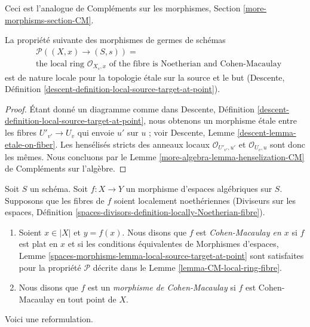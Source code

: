 \noindent
Ceci est l'analogue de Compléments sur les morphismes, Section
\ref{more-morphisms-section-CM}.

\begin{lemma}
\label{lemma-CM-local-ring-fibre}
La propriété suivante des morphismes de germes de schémas
\begin{align*}
& \mathcal{P}((X, x) \to (S, s)) = \\
& \text{the local ring }
\mathcal{O}_{X_s, x}
\text{ of the fibre is Noetherian and Cohen-Macaulay}
\end{align*}
est de nature locale pour la topologie étale sur la source et le but (Descente, Définition
\ref{descent-definition-local-source-target-at-point}).
\end{lemma}

\begin{proof}
Étant donné un diagramme comme dans
Descente, Définition \ref{descent-definition-local-source-target-at-point},
nous obtenons un morphisme étale entre les fibres
$U'_{v'} \to U_v$ qui envoie $u'$ sur $u$ ; voir
Descente, Lemme \ref{descent-lemma-etale-on-fiber}.
Les hensélisés stricts des anneaux locaux
$\mathcal{O}_{U'_{v'}, u'}$ et $\mathcal{O}_{U_v, u}$
sont donc les mêmes. Nous concluons par le
Lemme \ref{more-algebra-lemma-henselization-CM} de Compléments sur l'algèbre.
\end{proof}

\begin{definition}
\label{definition-CM}
Soit $S$ un schéma.
Soit $f : X \to Y$ un morphisme d'espaces algébriques sur $S$.
Supposons que les fibres de $f$ soient localement noethériennes
(Diviseurs sur les espaces, Définition
\ref{spaces-divisors-definition-locally-Noetherian-fibre}).
\begin{enumerate}
\item Soient $x \in |X|$ et $y = f(x)$. Nous disons que $f$ est
{\it Cohen-Macaulay en $x$} si $f$ est plat en $x$ et si
les conditions équivalentes de
Morphismes d'espaces, Lemme
\ref{spaces-morphisms-lemma-local-source-target-at-point}
sont satisfaites pour la propriété $\mathcal{P}$ décrite dans le
Lemme \ref{lemma-CM-local-ring-fibre}.
\item Nous disons que $f$ est un {\it morphisme de Cohen-Macaulay} si $f$ est
Cohen-Macaulay en tout point de $X$.
\end{enumerate}
\end{definition}

\noindent
Voici une reformulation.

